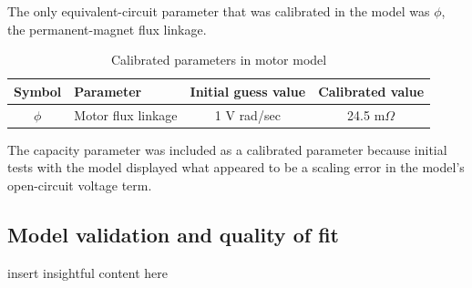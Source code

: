 \documentclass[../SimBALink.tex]{subfiles}
\begin{document}
			The only equivalent-circuit parameter that was calibrated in the model was $\phi$, the permanent-magnet flux linkage.
						
			\begin{table}
				\centering
				\caption{Calibrated parameters in motor model}
				\label{table:motor_calibrated_parameters}
				\begin{tabular}{c | l | c | c}
					Symbol		&	Parameter			&	Initial guess value	&	Calibrated value	\\
					\hline
					$\phi$		&	Motor flux linkage		&	1 V rad/sec	 	&	24.5 m$\Omega$
				\end{tabular}
			\end{table}
			
			The capacity parameter was included as a calibrated parameter because initial tests with the model displayed what appeared to be a scaling error in the model's open-circuit voltage term.
			
	\subsection{Model validation and quality of fit}
		insert insightful content here
		
		
\end{document}
